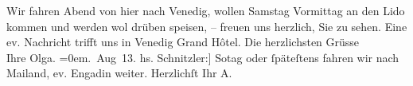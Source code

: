 \begin{ledgroupsized}[t]{13cm}
           \pstart
           {\pb}Wir fahren \label{KLL02149_Beer-Hofmann-Beer-HofmannP-1v}\label{KLL02149_Beer-Hofmann-Beer-HofmannP-1h}{ }Abend von hier nach Venedig, wollen
                  Samstag{ }Vormittag an den Lido kommen und werden
               wol drüben speisen, – freuen uns herzlich, Sie zu sehen. Eine ev. Nachricht trifft
               uns in Venedig Grand Hôtel.\pend
           \pstart
           Die herzlichsten Grüsse{\\[\baselineskip]}Ihre \spacefill\mbox{Olga.}\pend
           \leftskip=0em{}. Aug 13.\pend
           \pstart
           \noindent{}{\pb}{[}hs. Schnitzler:{]} So{\geminationn}tag oder ſpäteſtens \label{KLL02149_Beer-Hofmann-Beer-HofmannP-2v}\label{KLL02149_Beer-Hofmann-Beer-HofmannP-2h} fahren wir nach Mailand, ev. Engadin weiter.\pend
           \pstart Herzlichſt Ihr \spacefill\mbox{A.}\pend{}          \endnumbering{}\end{ledgroupsized}  \newcommand{\dateiname}{L02149}\newcommand{\titel}{Olga und Arthur Schnitzler an Richard und Paula Beer-Hofmann, 20. 8. 1913}\newcommand{\editorInnen}{Martin Anton Müller und Gerd-Hermann Susen}
            \footnotesize
\begin{ledgroupsized}[t]{11.5cm}
\end{ledgroupsized}
         
      